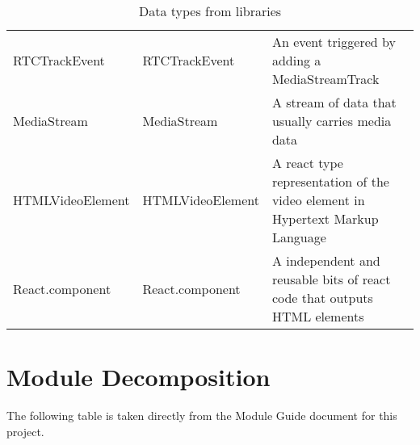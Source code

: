 \documentclass[12pt, titlepage]{article}
\begin{document}
\begin{table}[H]
\begin{tabular}{l l p{7.5cm}}
    RTCTrackEvent         & RTCTrackEvent         & An event triggered by adding a MediaStreamTrack                                                                                                                                                                                                           \\
    MediaStream           & MediaStream           & A stream of data that usually carries media data                                                                                                                                                                                                          \\
    HTMLVideoElement      & HTMLVideoElement      & A react type representation of the video element in Hypertext Markup Language                                                                                                                                                                             \\
    React.component       & React.component       & A independent and reusable bits of react code that outputs HTML elements                                                                                                                                                                                  \\
    \bottomrule
  \end{tabular}
  \caption{Data types from libraries}
\end{table}

\section{Module Decomposition}

The following table is taken directly from the Module Guide document for this project.
\end{document}
